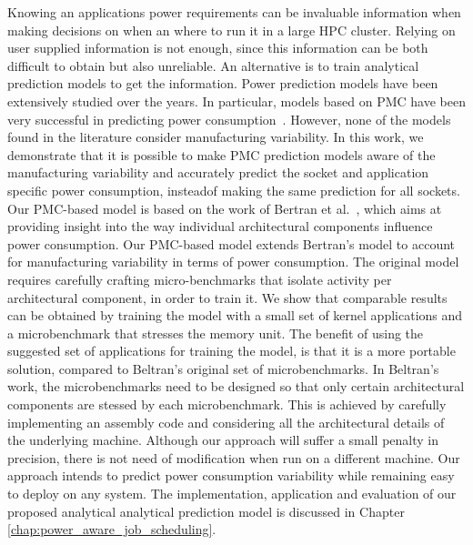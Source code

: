 
Knowing an applications power requirements can be invaluable information when making decisions
on when an where to run it in a large HPC cluster.  Relying on user supplied information is not
enough, since this information can be both difficult to obtain but also unreliable.
An alternative is to train analytical prediction models to get the information. 
Power prediction models have been extensively studied over the years.  In particular, models based on PMC
have been very successful in  predicting power consumption~\cite{Bircher:2012:CSP:2196827.2196987,Bertran:2012:SEC:2457472.2457499,Bertran:2010:DRP:1810085.1810108,Goel:2010:PSP:1909624.1909734,Isci:2003:RPM:956417.956567}.  
However, none of the models found in the literature consider manufacturing variability. 
In this work, we demonstrate that it is possible to make PMC prediction models aware of the 
manufacturing variability and accurately predict the socket and application specific power 
consumption, insteadof making the same prediction for all sockets.  
Our PMC-based model is based on the work of Bertran et al.~\cite{Bertran:2012:SEC:2457472.2457499,Bertran:2010:DRP:1810085.1810108}, which aims at providing insight into the way individual architectural components influence power consumption.
Our PMC-based model extends Bertran's model to account for manufacturing variability in terms of power consumption.
The original model requires carefully crafting micro-benchmarks that isolate activity per architectural component, in order to train it.  We show that comparable results can be obtained 
by training the model with a small set of kernel applications and a microbenchmark that stresses the memory unit.
The benefit of using the suggested set of applications for training the model, is that it is a more
portable solution, compared to Beltran's original set of microbenchmarks.  In Beltran's work, 
the microbenchmarks need to be designed so that only certain architectural components are stessed
by each microbenchmark.  This is achieved by carefully implementing an assembly code and considering
all the architectural details of the underlying machine.  Although our approach will suffer a small
penalty in precision, there is not need of modification when run on a different machine.
Our approach intends to predict power consumption variability while remaining easy to 
deploy on any system.
The implementation, application and evaluation of our proposed analytical
analytical prediction model is discussed in Chapter \ref{chap:power_aware_job_scheduling}. 


